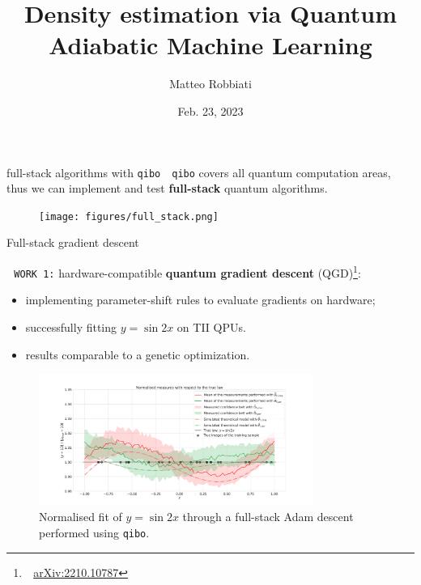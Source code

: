 \documentclass[8pt, xcolor={svgnames}, hyperref={colorlinks,linkcolor=black, citecolor=black, urlcolor=black}]{beamer}
\title{Density estimation via Quantum Adiabatic Machine Learning}
\date{Feb. 23, 2023}
\author[Matteo Robbiati]{Matteo Robbiati}
\begin{document}
\begin{frame}{full-stack algorithms with \texttt{qibo}}
\faTerminal\,\, \texttt{qibo} covers all quantum computation areas, thus 
we can implement and test \textbf{full-stack} quantum algorithms.

\begin{figure}
    \texttt{[image: figures/full\_stack.png]}%
    \label{fig:full_stack}
\end{figure}
\end{frame}


\begin{frame}{Full-stack gradient descent}

\faTerminal\,\, \texttt{WORK 1:} hardware-compatible 
    \textbf{quantum gradient descent} (QGD)\footnote{\faBook\,\, 
    \href{https://arxiv.org/abs/2210.10787}{arXiv:2210.10787}}:
\begin{itemize}[noitemsep]
    \item[\tiny\faSquare] implementing parameter-shift rules to evaluate gradients
    on hardware;
    \item[\tiny\faSquare] successfully fitting $y=\sin{2x}$ on TII QPUs.
    \item[\tiny\faSquare] results comparable to a genetic optimization.
\end{itemize}
\begin{figure}
    \includegraphics[width=0.8\textwidth]{figures/adam.pdf}%
    \caption{Normalised fit of $y=\sin{2x}$ through a full-stack Adam descent 
    performed using \texttt{qibo}.}
    \label{fig:adam}
\end{figure}

\end{frame}
\end{document}
